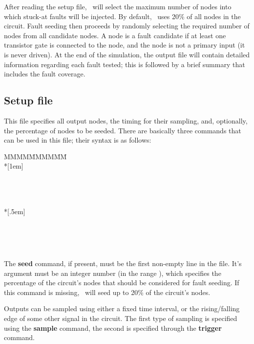 After reading the setup file, \ifsim\ will select the maximum number of nodes
into which stuck-at faults will be injected.  By default, \ifsim\ uses 20\%
of all nodes in the circuit.  Fault seeding then proceeds by randomly
selecting the required number of nodes from all candidate nodes.  A node is
a fault candidate if at least one transistor gate is connected to the node,
and the node is not a primary input (it is never driven).  At the end of the
simulation, the output file will contain detailed information regarding each
fault tested; this is followed by a brief summary that includes the fault
coverage.

\subsection{Setup file}

This file specifies all output nodes, the timing for their sampling, and,
optionally, the percentage of nodes to be seeded.  There are basically three
commands that can be used in this file; their syntax is as follows:

\begin{tabbing}
MMMM\=MMMM\=MM\= \kill
{}  \\*[1em]

      \\
\>\> \\
\>{\bf ***} \\*[.5em]

     \\
\>\> \\
\>{\bf ***} \\
\end{tabbing}

The {\bf seed} command, if present, must be the first non-empty line in the
file.  It's  argument must be an integer number (in the
range ), which specifies the percentage of the circuit's nodes
that should be considered for fault seeding.  If this command is missing,
\ifsim\ will seed up to 20\% of the circuit's nodes.

Outputs can be sampled using either a fixed time interval, or the
rising/falling edge of some other signal in the circuit.  The first type of
sampling is specified using the {\bf sample} command, the second is
specified through the {\bf trigger} command.

